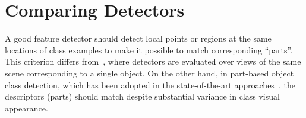 \documentclass[journal]{IEEEtran}
\begin{document}
%




%
\section{Comparing Detectors\label{sec:detectorcomparison}}
%
A good feature detector should detect local points or regions at the same
locations of class examples to make it possible to match corresponding ``parts''.
This criterion differs from~\cite{MikTuySch:2005}, where detectors are evaluated 
over views of the same scene corresponding to
a single object. On the other hand, in part-based object class detection,
which has been adopted in the state-of-the-art approaches~\cite{FelGirMca:2010},
the descriptors (parts) should match despite substantial variance in class visual
appearance.
\end{document}
